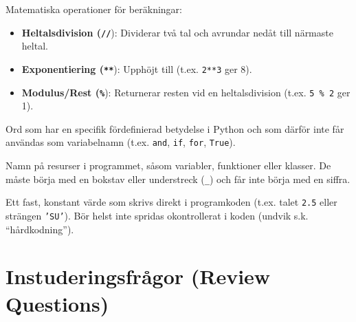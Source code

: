 \documentclass[11pt,a4paper]{article}
\begin{document}
\begin{description}[style=nextline, leftmargin=1cm, labelindent=0.5cm]
\begin{itemize}
    \end{itemize}
    \item[\color{primary}Aritmetiska operationer] Matematiska operationer för beräkningar:
    \begin{itemize}
        \item \textbf{Heltalsdivision (\texttt{//}}): Dividerar två tal och avrundar nedåt till närmaste heltal.
        \item \textbf{Exponentiering (\texttt{**}}): Upphöjt till (t.ex. \texttt{2**3} ger 8).
        \item \textbf{Modulus/Rest (\texttt{\%}}): Returnerar resten vid en heltalsdivision (t.ex. \texttt{5 \% 2} ger 1).
    \end{itemize}
    \item[\color{primary}Reserverade ord (Keywords)] Ord som har en specifik fördefinierad betydelse i Python och som därför inte får användas som variabelnamn (t.ex. \texttt{and}, \texttt{if}, \texttt{for}, \texttt{True}).
    \item[\color{primary}Identifierare (Identifiers)] Namn på resurser i programmet, såsom variabler, funktioner eller klasser. De måste börja med en bokstav eller understreck (\texttt{\_}) och får inte börja med en siffra.
    \item[\color{primary}Litteral] Ett fast, konstant värde som skrivs direkt i programkoden (t.ex. talet \texttt{2.5} eller strängen \texttt{'SU'}). Bör helst inte spridas okontrollerat i koden (undvik s.k. ``hårdkodning'').
\end{description}

\section*{Instuderingsfrågor (Review Questions)}
\end{document}
